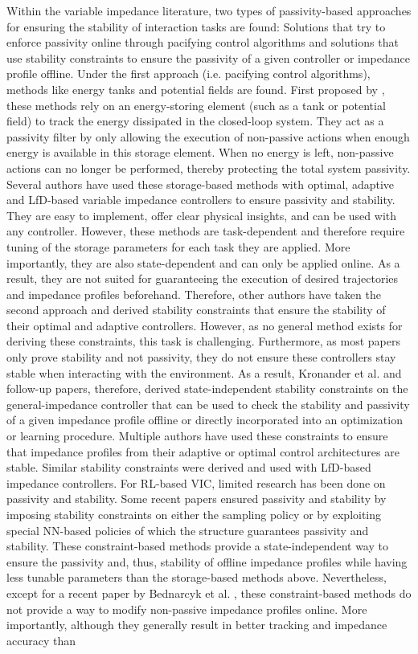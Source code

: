 Within the variable impedance literature, two types of passivity-based approaches for ensuring the stability of interaction tasks are found: Solutions that try to enforce passivity online through pacifying control algorithms and solutions that use stability constraints to ensure the passivity of a given controller or impedance profile offline. Under the first approach (i.e. pacifying control algorithms), methods like energy tanks and potential fields are found. First proposed by \cite{ferragutiTankbasedApproachImpedance2013}, these methods rely on an energy-storing element (such as a tank or potential field) to track the energy dissipated in the closed-loop system. They act as a passivity filter by only allowing the execution of non-passive actions when enough energy is available in this storage element. When no energy is left, non-passive actions can no longer be performed, thereby protecting the total system passivity. Several authors have used these storage-based methods with optimal, adaptive and LfD-based variable impedance controllers to ensure passivity and stability. They are easy to implement, offer clear physical insights, and can be used with any controller. However, these methods are task-dependent and therefore require tuning of the storage parameters for each task they are applied. More importantly, they are also state-dependent and can only be applied online. As a result, they are not suited for guaranteeing the execution of desired trajectories and impedance profiles beforehand. Therefore, other authors have taken the second approach and derived stability constraints that ensure the stability of their optimal and adaptive controllers. However, as no general method exists for deriving these constraints, this task is challenging. Furthermore, as most papers only prove stability and not passivity, they do not ensure these controllers stay stable when interacting with the environment. As a result, Kronander et al. \cite{kronanderStabilityConsiderationsVariable2016} and follow-up papers, therefore, derived state-independent stability constraints on the general-impedance controller that can be used to check the stability and passivity of a given impedance profile offline or directly incorporated into an optimization or learning procedure. Multiple authors have used these constraints to ensure that impedance profiles from their adaptive or optimal control architectures are stable. Similar stability constraints were derived and used with LfD-based impedance controllers. For RL-based VIC, limited research has been done on passivity and stability. Some recent papers ensured passivity and stability by imposing stability constraints on either the sampling policy or by exploiting special NN-based policies of which the structure guarantees passivity and stability. These constraint-based methods provide a state-independent way to ensure the passivity and, thus, stability of offline impedance profiles while having less tunable parameters than the storage-based methods above. Nevertheless, except for a recent paper by Bednarcyk et al. \cite {bednarczykPassivityFilterVariable2020}, these constraint-based methods do not provide a way to modify non-passive impedance profiles online. More importantly, although they generally result in better tracking and impedance accuracy than 